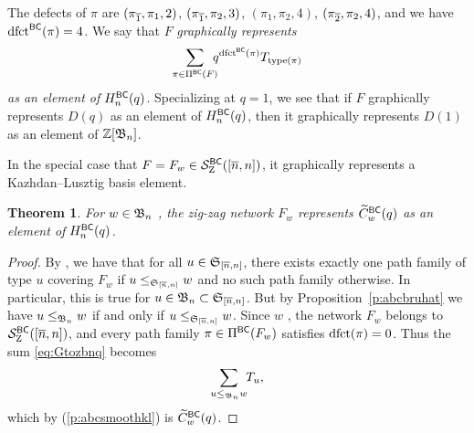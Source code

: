 \documentclass[11pt]{article}
\newtheorem{thm}[theo]{Theorem}
\theoremstyle{definition}
\numberwithin{equation}{section}
\begin{document}
The defects of $\pi$ are
$(\pi_{\overline{1}}, \pi_1, 2)$,
$(\pi_{\overline{1}}, \pi_2, 3)$,
$(\pi_1, \pi_2, 4)$,
$(\pi_{\overline{2}}, \pi_2, 4)$,
and we have $\mathrm{dfct}^{\mathsf{BC}}(\pi) = 4$.
We say that $F$ {\em graphically represents}
\begin{equation}\label{eq:Gtozbnq}
\sum_{\pi \in \PiBC(F)} \nTksp q^{\dfct^{\msfBC}(\pi)} T_{\type(\pi)}
\end{equation}
{\em as an element of $H_n^{\mathsf{BC}}(q)$}.
Specializing at $q=1$, we see that if $F$ graphically represents
$D(q)$ as an element of $H_n^{\mathsf{BC}}(q)$, then
it graphically represents
$D(1)$ as an element of $\mathbb{Z}[\mathfrak{B}_n]$.

In the special case that $F = F_w \in \mathcal S^{\mathsf{BC}}_{\mathrm Z}([\overline{n},n])$,
it graphically represents a Kazhdan--Lusztig basis element.
\begin{thm}\label{t:zigzagbc}
  For $w \in \mathfrak{B}_n$ \avoidingp, the zig-zag network $F_w$ represents
  $\widetilde{C}_{w}^{\mathsf{BC}}(q)$ as an element of $H_n^{\mathsf{BC}}(q)$.
  \end{thm}
\begin{proof}
  By \cite[Lem.\,5.3]{SkanNNDCB}, we have that for all $u \in \mathfrak{S}_{\smash{[\overline{n}, n]}}$,
  there exists exactly one path family of type $u$ covering $F_w$
  if $u \leq_{\mathfrak{S}_{\smash{[\overline{n}, n]}}} w$ and no such path family otherwise.
  In particular, this is true for $u \in \mathfrak{B}_n \subset \mathfrak{S}_{\smash{[\overline{n}, n]}}$.
  But by Proposition~\ref{p:abcbruhat}
  we have $u \leq_{\mathfrak{B}_n} w$ if and only if $u \leq_{\mathfrak{S}_{\smash{[\overline{n}, n]}}} w$.
  Since $w$ \avoidsp, the network $F_w$ belongs to $\mathcal S^{\mathsf{BC}}_{\mathrm Z}([\overline{n},n])$,
  and every path family
  $\pi \in \Pi^{\mathsf{BC}}(F_w)$ satisfies $\mathrm{dfct}(\pi) = 0$.  Thus the sum
  \eqref{eq:Gtozbnq} becomes
  \begin{equation*}
    \sum_{u \leq_{\mathfrak{B}_n} w} \negthickspace T_u,
  \end{equation*}
  which by (\ref{p:abcsmoothkl}) is $\widetilde{C}_{w}^{\mathsf{BC}}(q)$.
\end{proof}
\end{document}
